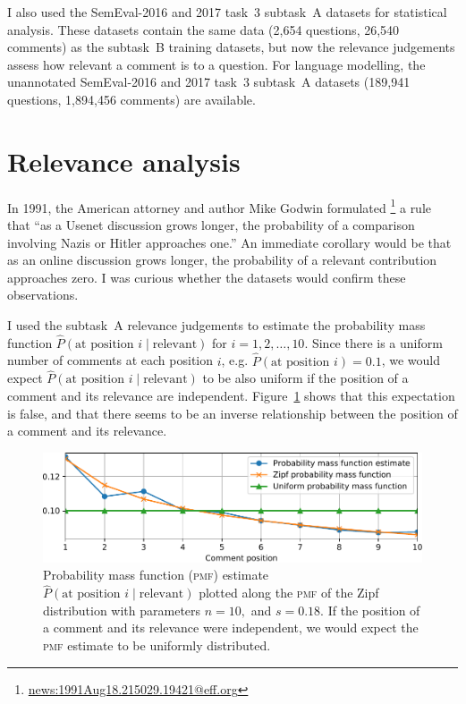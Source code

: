\documentclass[
  digital, %
  notable, %
  lof,     %
  lot,     %
  nopalatino, color
]{fithesis3}
\def\abbr#1{\textsc{\MakeLowercase{#1}}}
\let\note=\footnote
\begin{document}
I also used the SemEval-2016 and 2017 task~3 subtask~A datasets for
statistical analysis. These datasets contain the same data (2,654 questions,
26,540 comments) as the subtask~B training datasets, but now the relevance
judgements assess how relevant a comment is to a question.  For language
modelling, the unannotated SemEval-2016 and 2017 task~3 subtask~A
datasets (189,941 questions, 1,894,456 comments) are available.

\section{Relevance analysis}
\label{sec:dataset-relevance-analysis}
In 1991, the American attorney and author Mike Godwin formulated%
\note{\url{news:1991Aug18.215029.19421@eff.org}} a rule that ``as a Usenet
discussion grows longer, the probability of a comparison involving Nazis or
Hitler approaches one.'' An immediate corollary would be that as an online
discussion grows longer, the probability of a relevant contribution approaches
zero. I was curious whether the datasets would confirm these observations.

I used the subtask~A relevance judgements to estimate the probability mass
function $\hat P(\textrm{at position }i\mid\textrm{relevant})$ for
$i=1,2,\ldots,10$. Since there is a uniform number of comments at each
position $i$, e.g. $\hat P(\textrm{at position }i) = 0.1$, we would expect
$\hat P(\textrm{at position }i\mid\textrm{relevant})$ to be also uniform if
the position of a comment and its relevance are independent.
Figure~\ref{fig:dataset-relevance-analysis} shows that this expectation is
false, and that there seems to be an inverse relationship between the position
of a comment and its relevance.

\begin{figure}[tb]
\centering
\includegraphics[trim={0cm 0cm 0cm 0cm}, scale=0.75]{figs/quality-evaluation-1}
\caption[Probability mass function estimate $\hat P(\text{at position
}i\mid\text{relevant})$]{%
  Probability mass function (\abbr{pmf}) estimate $\hat
  P(\text{at position }i\mid\text{relevant})$ plotted along the \abbr{pmf} of
  the Zipf distribution with parameters $n=10,$ and $s=0.18$.  If the position
  of a comment and its relevance were independent, we would expect the
  \abbr{pmf} estimate to be uniformly distributed.}
\label{fig:dataset-relevance-analysis}
\end{figure}
\end{document}

